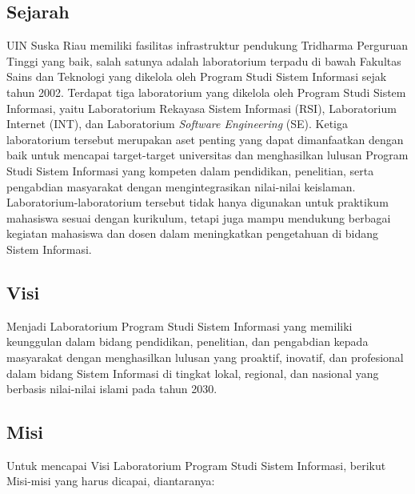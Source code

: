 \subsection{Sejarah}
\thispagestyle{fancy} %
UIN Suska Riau memiliki fasilitas infrastruktur pendukung Tridharma Perguruan Tinggi yang baik, salah satunya adalah laboratorium terpadu di bawah Fakultas Sains dan Teknologi yang dikelola oleh Program Studi Sistem Informasi sejak tahun 2002. Terdapat tiga laboratorium yang dikelola oleh Program Studi Sistem Informasi, yaitu Laboratorium Rekayasa Sistem Informasi (RSI), Laboratorium Internet (INT), dan Laboratorium \textit{Software Engineering} (SE). Ketiga laboratorium tersebut merupakan aset penting yang dapat dimanfaatkan dengan baik untuk mencapai target-target universitas dan menghasilkan lulusan Program Studi Sistem Informasi yang kompeten dalam pendidikan, penelitian, serta pengabdian masyarakat dengan mengintegrasikan nilai-nilai keislaman. Laboratorium-laboratorium tersebut tidak hanya digunakan untuk praktikum mahasiswa sesuai dengan kurikulum, tetapi juga mampu mendukung berbagai kegiatan mahasiswa dan dosen dalam meningkatkan pengetahuan di bidang Sistem Informasi.
\subsection{Visi}
Menjadi Laboratorium Program Studi Sistem Informasi yang memiliki keunggulan dalam bidang pendidikan, penelitian, dan pengabdian kepada masyarakat dengan menghasilkan lulusan yang proaktif, inovatif, dan profesional dalam bidang Sistem Informasi di tingkat lokal, regional, dan nasional yang berbasis nilai-nilai islami pada tahun 2030.
\subsection{Misi}
Untuk mencapai Visi Laboratorium Program Studi Sistem Informasi, berikut Misi-misi yang harus dicapai, diantaranya:

